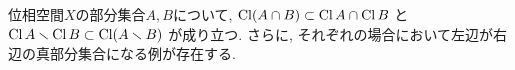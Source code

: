 \documentclass[uplatex, dvipdfmx, a4paper, 12pt, class=jsarticle, crop=false]{standalone}
\begin{document}
\begin{problem}[1.1.A]\label{eng-1-1-A-problem}
	位相空間\(X\)の部分集合\(A, B\)について,
	\(\mathop{\mathrm{Cl}}\nolimits (A \cap B) \subset \mathop{\mathrm{Cl}}\nolimits A \cap \mathop{\mathrm{Cl}}\nolimits B\)
	と
	\(\topcl A \setminus \topcl B \subset \topcl \lrparen{A \setminus B}\)
	が成り立つ.
	さらに, それぞれの場合において左辺が右辺の真部分集合になる例が存在する.
\end{problem}
\end{document}
